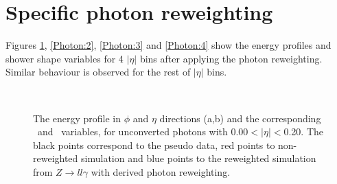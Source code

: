 \section{Specific photon reweighting}
\label{Adx1:Photon}

Figures \ref{Photon:1}, \ref{Photon:2}, \ref{Photon:3} and \ref{Photon:4} show the energy profiles and shower shape variables for 4 $|\eta|$ bins after applying the photon reweighting. Similar behaviour is observed for the rest of $|\eta|$ bins.  
\begin{figure}[htbp]
    \centering
	 \\
    \caption{The energy profile in $\phi$ and $\eta$ directions (a,b) and the corresponding \Rphi \ and \Reta \ variables, for unconverted photons with 0.00$<|\eta|<$0.20. The black points correspond to the pseudo data, red points to non-reweighted simulation and blue points to the reweighted simulation from $Z\rightarrow ll\gamma$ with derived photon reweighting.}
    \label{Photon:1}
\end{figure}
